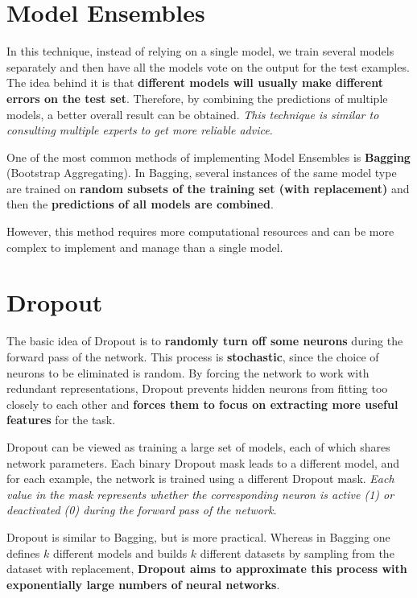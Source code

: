 \section{Model Ensembles}

In this technique, instead of relying on a single model, we train several models separately and then have all the models vote on the output for the test examples. The idea behind it is that \textbf{different models will usually make different errors on the test set}. Therefore, by combining the predictions of multiple models, a better overall result can be obtained. \textit{This technique is similar to consulting multiple experts to get more reliable advice.}

One of the most common methods of implementing Model Ensembles is \textbf{Bagging} (Bootstrap Aggregating). In Bagging, several instances of the same model type are trained on \textbf{random subsets of the training set (with replacement)} and then the \textbf{predictions of all models are combined}. 

However, this method requires more computational resources and can be more complex to implement and manage than a single model.

\section{Dropout}

The basic idea of Dropout is to \textbf{randomly turn off some neurons} during the forward pass of the network. This process is \textbf{stochastic}, since the choice of neurons to be eliminated is random. By forcing the network to work with redundant representations, Dropout prevents hidden neurons from fitting too closely to each other and \textbf{forces them to focus on extracting more useful features} for the task.

Dropout can be viewed as training a large set of models, each of which shares network parameters. Each binary Dropout mask leads to a different model, and for each example, the network is trained using a different Dropout mask. \textit{Each value in the mask represents whether the corresponding neuron is active (1) or deactivated (0) during the forward pass of the network.}

Dropout is similar to Bagging, but is more practical. Whereas in Bagging one defines \( k \) different models and builds \( k \) different datasets by sampling from the dataset with replacement, \textbf{Dropout aims to approximate this process with exponentially large numbers of neural networks}.

